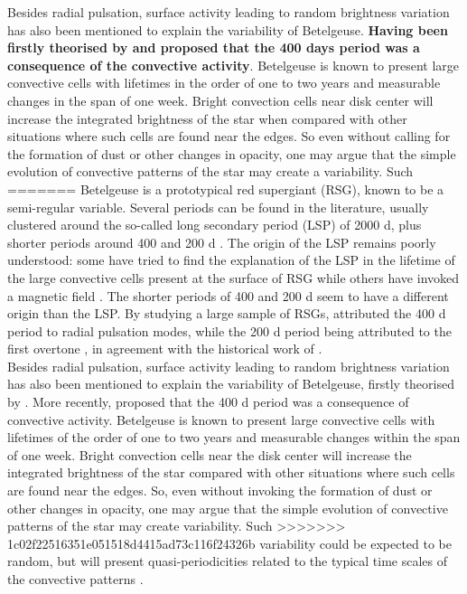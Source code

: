 \documentclass{aa}
\begin{document}
Besides radial pulsation, surface activity leading to random brightness variation has also been mentioned to explain the variability of Betelgeuse. 
\textbf{Having been firstly theorised by \cite{schwarzschild_scale_1975} and \cite{gray_mass_2008} 
proposed that the 400 days period was a consequence of the convective activity}. Betelgeuse is known to present large convective cells with lifetimes in the order of one to two years \citep{lopez_ariste_convective_2018} and measurable changes 
in the span of one week. Bright convection cells near disk center will increase the integrated brightness of the star when 
compared with other situations where such cells are found near the edges. So even without calling for the formation of 
dust or other changes in opacity, one may argue that the simple evolution of convective patterns of the star may create a variability. Such 
=======
Betelgeuse is a prototypical red supergiant (RSG), known to be a semi-regular variable. Several periods can be found in the 
literature, usually clustered around the so-called long secondary period (LSP) of 2000 d, plus shorter periods around 400 and 200 d \citep{kiss_variability_2006}. The origin of the LSP remains poorly understood: some have tried to find the explanation of the LSP in the lifetime of the large convective cells present at the surface of RSG \citep[e.g][]{stothers_giant_2010} while others have invoked a magnetic field \citep{wood_long_2004}. The shorter periods of 400 and 200 d seem to have a different origin than the LSP. By studying a large sample of RSGs, \cite{kiss_variability_2006} attributed the 400 d period to radial pulsation modes, while the 200 d period being attributed to the first overtone \citep{joyce_standing_2020}, in agreement with the historical work of \cite{stothers_pulsation_1969}.\\

Besides radial pulsation, surface activity leading to random brightness variation has also been mentioned to explain the variability of Betelgeuse, firstly theorised by \cite{schwarzschild_scale_1975}. More recently, \cite{gray_mass_2008} proposed that the 400 d period was a consequence of convective activity. Betelgeuse is known to present large convective cells with lifetimes of the order of one to two years \citep{lopez_ariste_convective_2018} and measurable changes 
within the span of one week. Bright convection cells near the disk center will increase the integrated brightness of the star compared with other situations where such cells are found near the edges. So, even without invoking the formation of 
dust or other changes in opacity, one may argue that the simple evolution of convective patterns of the star may create variability. Such 
>>>>>>> 1c02f22516351e051518d4415ad73c116f24326b
variability could be expected to be random, but will present quasi-periodicities related to the typical time scales of the 
convective patterns \citep{gray_mass_2008}. \\
\end{document}

